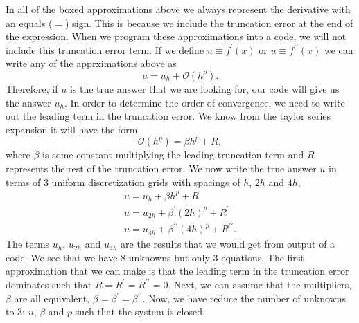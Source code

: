 In all of the boxed approximations above we always represent the derivative with an equals ($=$) sign. This is because we include the truncation error at the end of the expression. When we program these approximations into a code, we will not include
this truncation error term.  If we define $u\equiv f^{\prime}\left(x\right)$ or $u \equiv f^{\prime\prime}\left(x\right)$ we can 
write any of the apprximations above as
\begin{equation}
     u = u_{h}+ \mathcal{O}\left(h^{p}\right).
\end{equation}
Therefore, if $u$ is the true answer that we are looking for, our code will give us the answer $u_{h}$.  In order to determine
the order of convergence, we need to write out the leading term in the truncation error. We know from the taylor series 
expansion it will have the form
\begin{equation}
     \mathcal{O}\left(h^{p}\right) = \beta h^{p} + R,
\end{equation}
where $\beta$ is some constant multiplying the leading truncation term and $R$ represents the rest of the truncation error.
We now write the true answer $u$ in terms of 3 uniform discretization grids with spacings of $h$, $2h$ and $4h$,
\begin{eqnarray}
     u = u_{h} + \beta h^{p} + R 
   \label{eq:fdm_p_u} \\ 
     u = u_{2h} + \beta^{\prime}\left(2h\right)^{p} + R^{\prime}
  \label{eq:fdm_p_u2} \\
     u = u_{4h} + \beta^{\prime\prime}\left(4h\right)^{p} + R^{\prime\prime}.
  \label{eq:fdm_p_u4}
\end{eqnarray}
The terms $u_{h}$, $u_{2h}$ and $u_{4h}$ are the results that we would get from output of a code.  We see that we
have 8 unknowns but only 3 equations.  The first approximation that we can make is that the leading term in the truncation
error dominates such that $R=R^{\prime}=R^{\prime\prime}=0$. Next, we can assume that the multipliers, $\beta$ are 
all equivalent, $\beta=\beta^{\prime}=\beta^{\prime\prime}$.  Now, we have reduce the number of unknowns to 3: 
$u$, $\beta$ and $p$ such that the system is closed.

